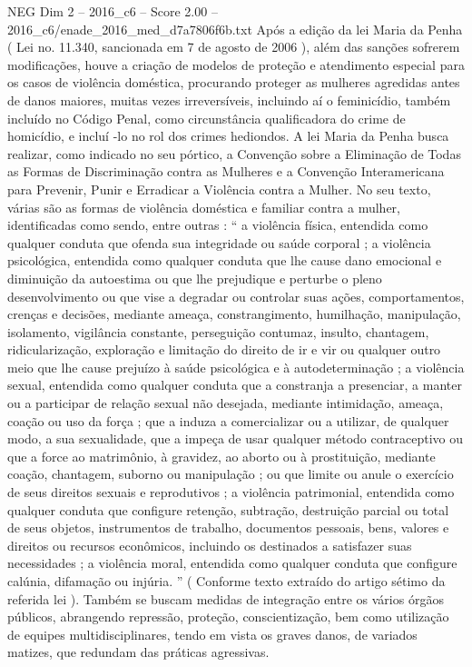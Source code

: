 \begin{textsample}{NEG Dim 2 – 2016\_c6 – Score 2.00 – 2016\_c6/enade\_2016\_med\_d7a7806f6b.txt}
Após a edição da lei Maria da Penha ( Lei no. 11.340, sancionada em 7 de agosto de 2006 ), além das sanções sofrerem modificações, houve a criação de modelos de proteção e atendimento especial para os casos de violência doméstica, procurando proteger as mulheres agredidas antes de danos maiores, muitas vezes irreversíveis, incluindo aí o feminicídio, também incluído no Código Penal, como circunstância qualificadora do crime de homicídio, e incluí -lo no rol dos crimes hediondos.
A lei Maria da Penha busca realizar, como indicado no seu pórtico, a Convenção sobre a Eliminação de Todas as Formas de Discriminação contra as Mulheres e a Convenção Interamericana para Prevenir, Punir e Erradicar a Violência contra a Mulher.
No seu texto, várias são as formas de violência doméstica e familiar contra a mulher, identificadas como sendo, entre outras : “ a violência física, entendida como qualquer conduta que ofenda sua integridade ou saúde corporal ; a violência psicológica, entendida como qualquer conduta que lhe cause dano emocional e diminuição da autoestima ou que lhe prejudique e perturbe o pleno desenvolvimento ou que vise a degradar ou controlar suas ações, comportamentos, crenças e decisões, mediante ameaça, constrangimento, humilhação, manipulação, isolamento, vigilância constante, perseguição contumaz, insulto, chantagem, ridicularização, exploração e limitação do direito de ir e vir ou qualquer outro meio que lhe cause prejuízo à saúde psicológica e à autodeterminação ; a violência sexual, entendida como qualquer conduta que a constranja a presenciar, a manter ou a participar de relação sexual não desejada, mediante intimidação, ameaça, coação ou uso da força ; que a induza a comercializar ou a utilizar, de qualquer modo, a sua sexualidade, que a impeça de usar qualquer método contraceptivo ou que a force ao matrimônio, à gravidez, ao aborto ou à prostituição, mediante coação, chantagem, suborno ou manipulação ; ou que limite ou anule o exercício de seus direitos sexuais e reprodutivos ; a violência patrimonial, entendida como qualquer conduta que configure retenção, subtração, destruição parcial ou total de seus objetos, instrumentos de trabalho, documentos pessoais, bens, valores e direitos ou recursos econômicos, incluindo os destinados a satisfazer suas necessidades ; a violência moral, entendida como qualquer conduta que configure calúnia, difamação ou injúria. ” ( Conforme texto extraído do artigo sétimo da referida lei ).
Também se buscam medidas de integração entre os vários órgãos públicos, abrangendo repressão, proteção, conscientização, bem como utilização de equipes multidisciplinares, tendo em vista os graves danos, de variados matizes, que redundam das práticas agressivas.

\end{textsample}
